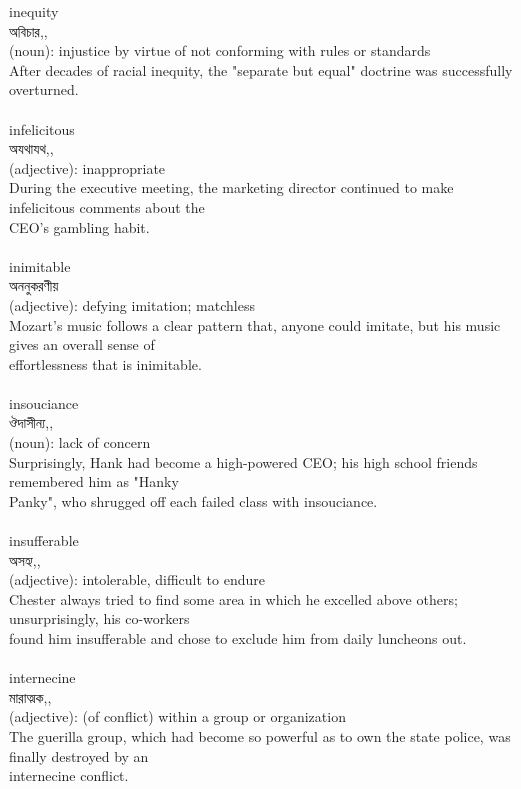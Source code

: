 \documentclass{article}
\begin{document}
{{inequity}\\
{অবিচার,,}\\
{(noun): injustice by virtue of not conforming with rules or standards\\After decades of racial inequity, the "separate but equal" doctrine was successfully overturned.\\}\\
{infelicitous}\\
{অযথাযথ,,}\\
{(adjective): inappropriate\\During the executive meeting, the marketing director continued to make infelicitous comments about the\\CEO's gambling habit.\\}\\
{inimitable}\\
{অননুকরণীয়}\\
{(adjective): defying imitation; matchless\\Mozart's music follows a clear pattern that, anyone could imitate, but his music gives an overall sense of\\effortlessness that is inimitable.\\}\\
{insouciance}\\
{ঔদাসীন্য,,}\\
{(noun): lack of concern\\Surprisingly, Hank had become a high-powered CEO; his high school friends remembered him as "Hanky\\Panky", who shrugged off each failed class with insouciance.\\}\\
{insufferable}\\
{অসহ্য,,}\\
{(adjective): intolerable, difficult to endure\\Chester always tried to find some area in which he excelled above others; unsurprisingly, his co-workers\\found him insufferable and chose to exclude him from daily luncheons out.\\}\\
{internecine}\\
{মারাত্মক,,}\\
{(adjective): (of conflict) within a group or organization\\The guerilla group, which had become so powerful as to own the state police, was finally destroyed by an\\internecine conflict.\\}\\
}
\end{document}
